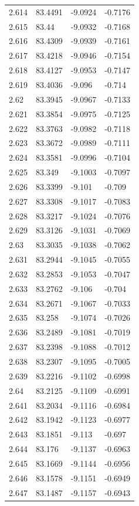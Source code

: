 \begin{tabular}{llll}
2.614 & 83.4491 & -9.0924 & -0.7176 \\
2.615 & 83.44 & -9.0932 & -0.7168 \\
2.616 & 83.4309 & -9.0939 & -0.7161 \\
2.617 & 83.4218 & -9.0946 & -0.7154 \\
2.618 & 83.4127 & -9.0953 & -0.7147 \\
2.619 & 83.4036 & -9.096 & -0.714 \\
2.62 & 83.3945 & -9.0967 & -0.7133 \\
2.621 & 83.3854 & -9.0975 & -0.7125 \\
2.622 & 83.3763 & -9.0982 & -0.7118 \\
2.623 & 83.3672 & -9.0989 & -0.7111 \\
2.624 & 83.3581 & -9.0996 & -0.7104 \\
2.625 & 83.349 & -9.1003 & -0.7097 \\
2.626 & 83.3399 & -9.101 & -0.709 \\
2.627 & 83.3308 & -9.1017 & -0.7083 \\
2.628 & 83.3217 & -9.1024 & -0.7076 \\
2.629 & 83.3126 & -9.1031 & -0.7069 \\
2.63 & 83.3035 & -9.1038 & -0.7062 \\
2.631 & 83.2944 & -9.1045 & -0.7055 \\
2.632 & 83.2853 & -9.1053 & -0.7047 \\
2.633 & 83.2762 & -9.106 & -0.704 \\
2.634 & 83.2671 & -9.1067 & -0.7033 \\
2.635 & 83.258 & -9.1074 & -0.7026 \\
2.636 & 83.2489 & -9.1081 & -0.7019 \\
2.637 & 83.2398 & -9.1088 & -0.7012 \\
2.638 & 83.2307 & -9.1095 & -0.7005 \\
2.639 & 83.2216 & -9.1102 & -0.6998 \\
2.64 & 83.2125 & -9.1109 & -0.6991 \\
2.641 & 83.2034 & -9.1116 & -0.6984 \\
2.642 & 83.1942 & -9.1123 & -0.6977 \\
2.643 & 83.1851 & -9.113 & -0.697 \\
2.644 & 83.176 & -9.1137 & -0.6963 \\
2.645 & 83.1669 & -9.1144 & -0.6956 \\
2.646 & 83.1578 & -9.1151 & -0.6949 \\
2.647 & 83.1487 & -9.1157 & -0.6943 \\

\end{tabular}
